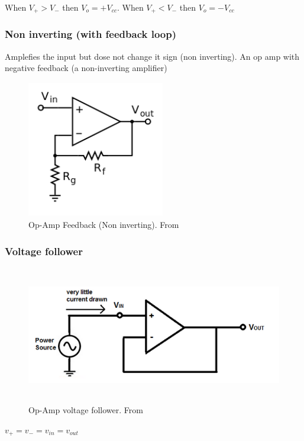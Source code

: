 When $V_+>V_-$ then $V_o=+V_{cc}$. When $V_+<V_-$ then $V_o=-V_{cc}$

\subsubsection{Non inverting (with feedback loop)}
Amplefies the input but dose not change it sign (non inverting).
An op amp with negative feedback (a non-inverting amplifier)

\begin{figure}[h]
    \vspace{10mm}
    \centering
    \includegraphics[width=6cm, height=6cm]{image/Operational_amplifier_noninverting.png}
    \caption{Op-Amp Feedback (Non inverting). From \cite{}}
\end{figure}

\newpage
\subsubsection{Voltage follower}
\begin{figure}[h]
    \vspace{10mm}
    \centering
    \includegraphics[width=12cm, height=6cm]{image/op-amp-voltage-follower.png}
    \caption{Op-Amp voltage follower. From \cite{}}
\end{figure}
$v_+=v_-=v_{in}=v_{out}$

